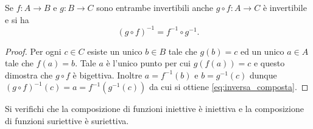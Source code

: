\begin{theorem}
Se $f\colon A\to B$ e $g\colon B\to C$ sono entrambe invertibili
anche $g\circ f\colon A\to C$ è invertibile e si ha 
\begin{equation}\label{eq:inversa_composta}
  (g\circ f)^{-1} = f^{-1}\circ g^{-1}.
\end{equation}
\end{theorem}
\begin{proof}    
Per ogni $c\in C$ esiste un unico $b\in B$ tale che $g(b)=c$ 
ed un unico $a\in A$ tale che $f(a)=b$. 
Tale $a$ è l'unico punto per cui $g(f(a))=c$ e questo dimostra che 
$g\circ f$ è bigettiva. Inoltre $a=f^{-1}(b)$ e $b=g^{-1}(c)$ 
dunque $(g\circ f)^{-1}(c) = a = f^{-1}(g^{-1}(c))$ da cui si ottiene 
\eqref{eq:inversa_composta}.
\end{proof}

\begin{exercise}
  Si verifichi che la composizione di funzioni iniettive è iniettiva e la composizione 
  di funzioni suriettive è suriettiva.
\end{exercise}

